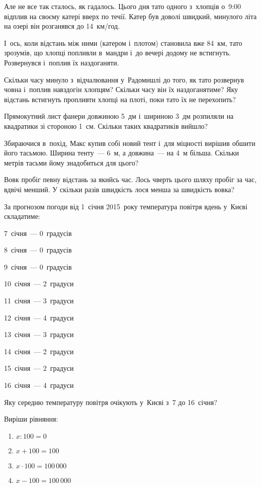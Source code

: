 Але не все так сталось, як гадалось. Цього дня тато одного з~хлопців
о~9:00 відплив на своєму катері вверх по течії. Катер був доволі швидкий,
минулого літа на озері він розганявся до 14~км/год.

І~ось, коли відстань між ними (катером і~плотом) становила вже 84~км,
тато зрозумів, що хлопці попливли в~мандри і~до вечері додому не встигнуть.
Розвернувся і~поплив їх наздоганяти.

Скільки часу минуло з~відчалювання у~Радомишлі до того, як тато
розвернув човна і~поплив навздогін хлопцям?
Скільки часу він їх наздоганятиме?
Яку відстань встигнуть пропливти хлопці на плоті, поки тато їх не перехопить?


\problem
Прямокутний лист фанери довжиною 5~дм і~шириною 3~дм розпиляли на квадратики
зі стороною 1~см.
Скільки таких квадратиків вийшло?


\problem
Збираючися в~похід, Макс купив собі новий тент і~для міцності вирішив
обшити його тасьмою. Ширина тенту~--- 6~м, а довжина~--- на 4~м більша.
Скільки метрів тасьми йому знадобиться для цього?


\problem
Вовк пробіг певну відстань за якийсь час.
Лось чверть цього шляху пробіг за час, вдвічі менший.
У скільки разів швидкість лося менша за швидкість вовка?


\problem
За прогнозом погоди від 1~січня 2015~року температура повітря вдень
у~Києві складатиме:

\begin{multicols}{2}
    7~січня~--- 0~градусів

    8~січня~--- 0~градусів

    9~січня~--- 0~градусів

    10~січня~--- 2~градуси

    11~січня~--- 3~градуси

    12~січня~--- 4~градуси

    13~січня~--- 3~градуси

    14~січня~--- 2~градуси

    15~січня~--- 2~градуси

    16~січня~--- 4~градуси
\end{multicols}

Яку середню температуру повітря очікують у~Києві з~7 до 16~січня?


\problem
Виріши рівняння:
\begin{multicols}{2}
    \begin{enumerate}
        \item $x : 100 = 0$
        \item $x + 100 = 100$
        \item $x \cdot 100 = 100\,000$
        \item $x - 100 = 100\,000$
    \end{enumerate}
\end{multicols}


